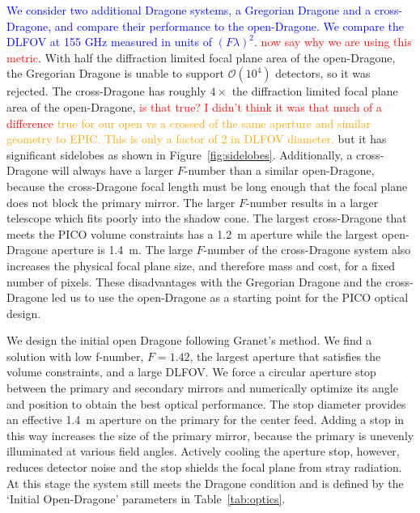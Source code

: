\documentclass[]{spie}  %
\newcommand{\comr}[1]{\textcolor{red}{#1}}
\newcommand{\comb}[1]{\textcolor{blue}{#1}}
\newcommand{\como}[1]{\textcolor{orange}{#1}}
\begin{document}
\comb{We consider two additional Dragone systems, a Gregorian Dragone and a cross-Dragone, and compare their performance to 
the open-Dragone. We compare the DLFOV at 155 GHz measured in units of $(F\lambda)^2$}. \comr{now say why we are using this
metric}. 
With half the diffraction limited focal plane 
area of the open-Dragone,\cite{core2018_inst} the Gregorian Dragone is unable to support $\mathcal{O}(10^4)$ detectors, so it was rejected.  
The cross-Dragone has roughly $4\times$ the diffraction limited focal plane area of the open-Dragone, 
\comr{is that true? I didn't think it was that much of a difference} \como{true for our open vs a crossed of the same aperture and similar geometry to EPIC. This is only a factor of 2 in DLFOV diameter. }
but it has significant sidelobes as shown in Figure~\ref{fig:sidelobes}. Additionally, a cross-Dragone will always have a larger $F$-number 
than a similar open-Dragone, because the cross-Dragone focal length must be long enough that the focal plane does not block the primary mirror.
The larger $F$-number results in a larger telescope which fits poorly into the shadow cone. The largest cross-Dragone 
that meets the PICO volume constraints has 
a 1.2~m aperture while the largest open-Dragone aperture is 1.4~m. The large $F$-number of the cross-Dragone system also increases 
the physical focal plane size, and therefore mass and cost, for a fixed number of pixels.  
These disadvantages with the Gregorian Dragone and the cross-Dragone led us to use the open-Dragone as a starting point for the PICO optical design.

We design the initial open Dragone following Granet's method\cite{granet2001}. 
We find a solution with low f-number, $F=1.42$, the largest aperture that satisfies the volume constraints, and a large 
DLFOV.  We force a circular aperture stop 
between the primary and secondary mirrors and numerically optimize its angle and position to obtain the best 
optical performance.  The stop diameter provides an effective 1.4~m aperture on the primary for the center feed.  
Adding a stop in this way increases the size of the primary mirror, because the primary is unevenly illuminated at various 
field angles.
Actively cooling the aperture stop, however, reduces detector noise and the stop shields the 
focal plane from stray radiation. At this stage the system still meets 
the Dragone condition and is defined by the `Initial Open-Dragone' parameters in Table~\ref{tab:optics}.
\end{document}
